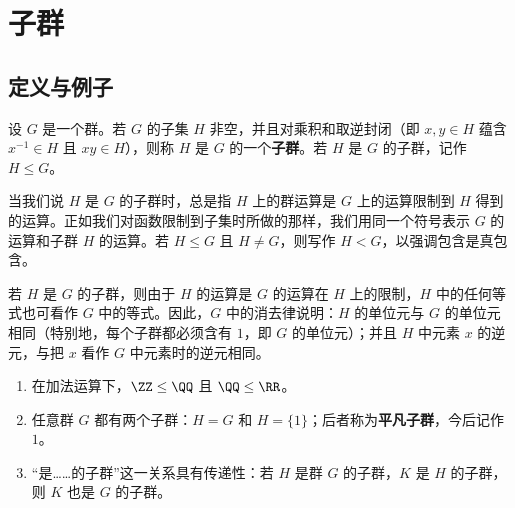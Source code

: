 \setchapterintro{}
\chapter{子群}
\section{定义与例子}
\begin{definition}
	 设 $G$ 是一个群。若 $G$ 的子集 $H$ 非空，并且对乘积和取逆封闭（即 $x,y\in H$ 蕴含 $x^{-1}\in H$ 且 $xy\in H$），则称 $H$ 是 $G$ 的一个\textbf{子群}。若 $H$ 是 $G$ 的子群，记作 $H\leqslant G$。
\end{definition}



当我们说 $H$ 是 $G$ 的子群时，总是指 $H$ 上的群运算是 $G$ 上的运算限制到 $H$ 得到的运算。正如我们对函数限制到子集时所做的那样，我们用同一个符号表示 $G$ 的运算和子群 $H$ 的运算。若 $H\leq G$ 且 $H\neq G$，则写作 $H<G$，以强调包含是真包含。

若 $H$ 是 $G$ 的子群，则由于 $H$ 的运算是 $G$ 的运算在 $H$ 上的限制，$H$ 中的任何等式也可看作 $G$ 中的等式。因此，$G$ 中的消去律说明：$H$ 的单位元与 $G$ 的单位元相同（特别地，每个子群都必须含有 $1$，即 $G$ 的单位元）；并且 $H$ 中元素 $x$ 的逆元，与把 $x$ 看作 $G$ 中元素时的逆元相同。

\begin{example}
	\begin{enumerate}[label=(\arabic*)]
		\item 在加法运算下，$\ZZ\leq \QQ$ 且 $\QQ\leq \RR$。
		\item 任意群 $G$ 都有两个子群：$H=G$ 和 $H=\{1\}$；后者称为\textbf{平凡子群}，今后记作 $1$。
		\item “是……的子群”这一关系具有传递性：若 $H$ 是群 $G$ 的子群，$K$ 是 $H$ 的子群，则 $K$ 也是 $G$ 的子群。
	\end{enumerate}
\end{example}

